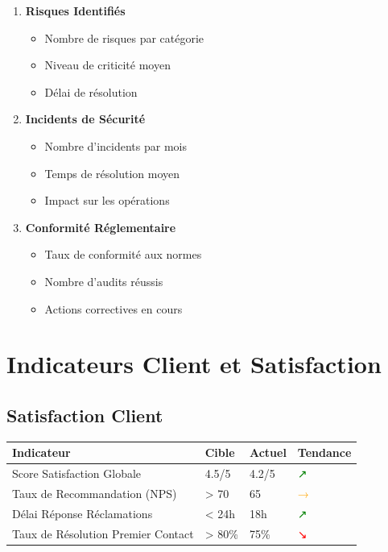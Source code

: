 \documentclass[12pt,a4paper]{article}
\begin{document}
\begin{enumerate}
    \item \textbf{Risques Identifiés}
    \begin{itemize}
        \item Nombre de risques par catégorie
        \item Niveau de criticité moyen
        \item Délai de résolution
    \end{itemize}
    
    \item \textbf{Incidents de Sécurité}
    \begin{itemize}
        \item Nombre d'incidents par mois
        \item Temps de résolution moyen
        \item Impact sur les opérations
    \end{itemize}
    
    \item \textbf{Conformité Réglementaire}
    \begin{itemize}
        \item Taux de conformité aux normes
        \item Nombre d'audits réussis
        \item Actions correctives en cours
    \end{itemize}
\end{enumerate}

\section{Indicateurs Client et Satisfaction}

\subsection{Satisfaction Client}

\begin{longtable}{|p{4cm}|p{2cm}|p{2cm}|p{4cm}|}
\hline
\rowcolor{lightgray}
\textbf{Indicateur} & \textbf{Cible} & \textbf{Actuel} & \textbf{Tendance} \\
\hline
\endhead

Score Satisfaction Globale & 4.5/5 & 4.2/5 & \textcolor{green}{↗} \\
\hline
Taux de Recommandation (NPS) & > 70 & 65 & \textcolor{orange}{→} \\
\hline
Délai Réponse Réclamations & < 24h & 18h & \textcolor{green}{↗} \\
\hline
Taux de Résolution Premier Contact & > 80\% & 75\% & \textcolor{red}{↘} \\
\hline
\end{longtable}
\end{document}
